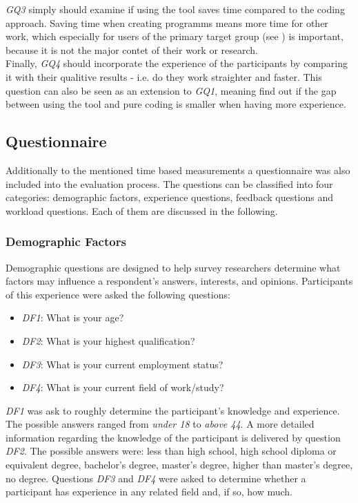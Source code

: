 \textit{GQ3} simply should examine if using the tool saves time compared to the coding approach. Saving time when creating programms means more time for other work, which especially for users of the primary target group (see ) is important, because it is not the major contet of their work or research. \\

Finally, \textit{GQ4} should incorporate the experience of the participants by comparing it with their qualitive results - i.e. do they work straighter and faster. This question can also be seen as an extension to \textit{GQ1}, meaning find out if the gap between using the tool and pure coding is smaller when having more experience.

\subsection{Questionnaire}
Additionally to the mentioned time based measurements a questionnaire was also included into the evaluation process. The questions can be classified into four categories: demographic factors, experience questions, feedback questions and workload questions. Each of them are discussed in the following.

\subsubsection*{Demographic Factors}
Demographic questions are designed to help survey researchers determine what factors may influence a respondent's answers, interests, and opinions. Participants of this experience were asked the following questions:

\begin{itemize}
    \item \textit{DF1}: What is your age?
    \item \textit{DF2}: What is your highest qualification?
    \item \textit{DF3}: What is your current employment status?
    \item \textit{DF4}: What is your current field of work/study?
\end{itemize}
\textit{DF1} was ask to roughly determine the participant's knowledge and experience. The possible answers ranged from \textit{under 18} to \textit{above 44}. A more detailed information regarding the knowledge of the participant is delivered by question \textit{DF2}. The possible answers were: less than high school, high school diploma or equivalent degree, bachelor's degree, master's degree, higher than master's degree, no degree. Questions \textit{DF3} and \textit{DF4} were asked to determine whether a participant has experience in any related field and, if so, how much.

